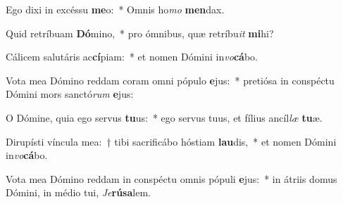 \item Ego dixi in excéssu \textbf{me}o:~* Omnis ho\textit{mo} \textbf{men}dax.
\item Quid retríbuam \textbf{Dó}mino,~* pro ómnibus, quæ retríbu\textit{it} \textbf{mi}hi?
\item Cálicem salutáris ac\textbf{cí}piam:~* et nomen Dómini in\textit{vo}\textbf{cá}bo.
\item Vota mea Dómino reddam coram omni pópulo \textbf{e}jus:~* pretiósa in conspéctu Dómini mors sanctó\textit{rum} \textbf{e}jus:
\item O Dómine, quia ego servus \textbf{tu}us:~* ego servus tuus, et fílius ancíl\textit{læ} \textbf{tu}æ.
\item Dirupísti víncula mea:~† tibi sacrificábo hóstiam \textbf{lau}dis,~* et nomen Dómini in\textit{vo}\textbf{cá}bo.
\item Vota mea Dómino reddam in conspéctu omnis pópuli \textbf{e}jus:~* in átriis domus Dómini, in médio tui, \textit{Je}\textbf{rú}\textbf{sa}lem.
